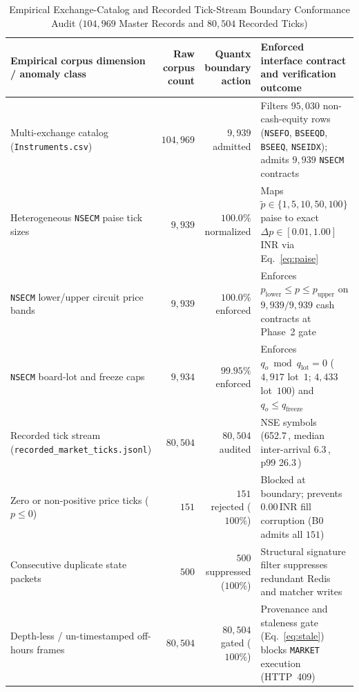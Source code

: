 \documentclass[journal,onecolumn,10pt]{IEEEtran}
\newcommand{\thinunit}[2]{#1\,\text{#2}}
\begin{document}
\begin{table}[!t]
\caption{Empirical Exchange-Catalog and Recorded Tick-Stream Boundary Conformance Audit ($104{,}969$ Master Records and $80{,}504$ Recorded Ticks)}
\label{tab:realdata}
\centering
\small
\renewcommand{\arraystretch}{1.12}
\begin{tabularx}{\textwidth}{@{}>{\raggedright\arraybackslash}p{2.35in} r r >{\raggedright\arraybackslash}X@{}}
\toprule
Empirical corpus dimension / anomaly class & Raw corpus count & Quantx boundary action & Enforced interface contract and verification outcome \\
\midrule
Multi-exchange catalog (\texttt{Instruments.csv}) & $104{,}969$ & $9{,}939$ admitted & Filters $95{,}030$ non-cash-equity rows (\texttt{NSEFO}, \texttt{BSEEQD}, \texttt{BSEEQ}, \texttt{NSEIDX}); admits $9{,}939$ \texttt{NSECM} contracts \\
Heterogeneous \texttt{NSECM} paise tick sizes & $9{,}939$ & $100.0\%$ normalized & Maps $\tilde{p}\in\{1,5,10,50,100\}$ paise to exact $\Delta p\in[0.01,1.00]$ INR via Eq.~\eqref{eq:paise} \\
\texttt{NSECM} lower/upper circuit price bands & $9{,}939$ & $100.0\%$ enforced & Enforces $p_{\mathrm{lower}}\le p\le p_{\mathrm{upper}}$ on $9{,}939/9{,}939$ cash contracts at Phase~2 gate \\
\texttt{NSECM} board-lot and freeze caps & $9{,}934$ & $99.95\%$ enforced & Enforces $q_o\bmod q_{\mathrm{lot}}=0$ ($4{,}917$ lot~$1$; $4{,}433$ lot~$100$) and $q_o\le q_{\mathrm{freeze}}$ \\
Recorded tick stream (\texttt{recorded\_market\_ticks.jsonl}) & $80{,}504$ & $80{,}504$ audited & 100 NSE symbols (\thinunit{652.7}{s}, median inter-arrival \thinunit{6.3}{ms}, p99 \thinunit{26.3}{ms}) \\
Zero or non-positive price ticks ($p \le 0$) & $151$ & $151$ rejected ($100\%$) & Blocked at boundary; prevents $\thinunit{0.00}{INR}$ fill corruption (B0 admits all $151$) \\
Consecutive duplicate state packets & $500$ & $500$ suppressed ($100\%$) & Structural signature filter suppresses redundant Redis and matcher writes \\
Depth-less / un-timestamped off-hours frames & $80{,}504$ & $80{,}504$ gated ($100\%$) & Provenance and staleness gate (Eq.~\eqref{eq:stale}) blocks \texttt{MARKET} execution (HTTP~409) \\
\bottomrule
\end{tabularx}
\end{table}
\end{document}
